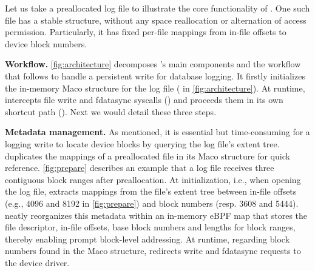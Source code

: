 Let us take a preallocated log file to 
illustrate the core functionality of \odes.
 One such file  has a stable structure, 
%
without any space reallocation or alternation of access permission.
Particularly, it has
fixed per-file mappings from
 in-file offsets to device block numbers. 
% 


\textbf{Workflow.} \autoref{fig:architecture} decomposes \odes's main components
and the workflow that \odes follows to handle a persistent write for database logging.
It firstly initializes the in-memory Maco structure for the log file ( in \autoref{fig:architecture}).
At runtime,  \odes intercepts file write and fdatasync syscalls
() and proceeds them in its own shortcut path ().
Next we would detail these three steps.

\textbf{Metadata management.}
As mentioned, %
it is essential but time-consuming for a logging write
to locate device blocks   by querying the log file's extent tree.
 \odes duplicates  the mappings of a preallocated file in its Maco structure for quick reference. 
\autoref{fig:prepare} describes an example that a log file receives
three contiguous block ranges after preallocation. %
 At initialization, i.e., when opening the log   file, \odes extracts  mappings from the file's extent tree
between  in-file offsets (e.g., 4096 and 8192 in   \autoref{fig:prepare}) and    block numbers (resp. 3608 and 5444). 
\odes neatly reorganizes this metadata
 within an in-memory eBPF map that stores the file descriptor, in-file offsets, base block numbers and lengths for block ranges, thereby enabling prompt block-level addressing. %
At runtime,
regarding block numbers found in the Maco structure,
\odes   %
redirects   write and fdatasync requests to the device driver. %




